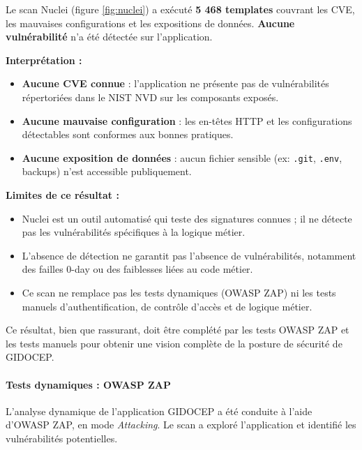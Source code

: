 \documentclass[12pt,a4paper,oneside]{report}
\begin{document}
Le scan Nuclei (figure \ref{fig:nuclei}) a exécuté \textbf{5 468 templates} 
couvrant les CVE, les mauvaises configurations et les expositions de 
données. \textbf{Aucune vulnérabilité} n'a été détectée sur l'application.

\textbf{Interprétation :}
\begin{itemize}[label={\color{gold}}, leftmargin=*]
	\item \textbf{Aucune CVE connue} : l'application ne présente pas de 
	vulnérabilités répertoriées dans le NIST NVD sur les composants exposés.
	\item \textbf{Aucune mauvaise configuration} : les en-têtes HTTP et 
	les configurations détectables sont conformes aux bonnes pratiques.
	\item \textbf{Aucune exposition de données} : aucun fichier sensible 
	(ex: \texttt{.git}, \texttt{.env}, backups) n'est accessible 
	publiquement.
\end{itemize}

\textbf{Limites de ce résultat :}
\begin{itemize}[label={\color{gold}}, leftmargin=*]
	\item Nuclei est un outil automatisé qui teste des signatures connues ; 
	il ne détecte pas les vulnérabilités spécifiques à la logique métier.
	\item L'absence de détection ne garantit pas l'absence de vulnérabilités, 
	notamment des failles 0-day ou des faiblesses liées au code métier.
	\item Ce scan ne remplace pas les tests dynamiques (OWASP ZAP) ni les 
	tests manuels d'authentification, de contrôle d'accès et de logique 
	métier.
\end{itemize}

Ce résultat, bien que rassurant, doit être complété par les tests OWASP ZAP 
et les tests manuels pour obtenir une vision complète de la posture de 
sécurité de GIDOCEP.

\paragraph{Tests dynamiques : OWASP ZAP}

L'analyse dynamique de l'application GIDOCEP a été conduite à l'aide d'OWASP ZAP, 
en mode \textit{Attacking}. Le scan a exploré l'application et identifié les 
vulnérabilités potentielles.

\end{document}
